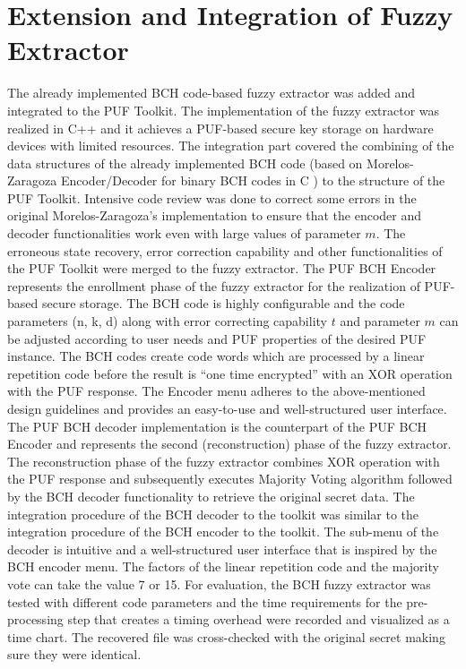 \section{Extension and Integration of Fuzzy Extractor}
The already implemented BCH code-based fuzzy extractor was added and integrated to the PUF Toolkit. The implementation of the fuzzy extractor was realized in C++ and it achieves a PUF-based secure key storage on hardware devices with limited resources. The integration part covered the combining of the data structures of the already implemented BCH code (based on Morelos-Zaragoza Encoder/Decoder for binary BCH codes in C \cite{69}) to the structure of the PUF Toolkit. Intensive code review was
done to correct some errors in the original Morelos-Zaragoza's implementation to ensure that the encoder and decoder functionalities work even with large values of parameter $m$. The erroneous state recovery, error correction capability and other functionalities of the PUF Toolkit were merged to the fuzzy extractor. The PUF BCH Encoder represents the enrollment phase of the fuzzy extractor for the realization of PUF-based secure storage. The BCH code is highly configurable and the code
parameters (n, k, d) along with error correcting capability $t$ and parameter $m$ can be adjusted according to user needs and PUF properties of the desired PUF instance. The BCH codes create code words which are processed by a linear repetition code before the result is ``one time encrypted'' with an XOR operation with the PUF response. The Encoder menu adheres to the above-mentioned design guidelines and provides an easy-to-use and well-structured user interface. The PUF BCH decoder
implementation is the counterpart of the PUF BCH Encoder and represents the second (reconstruction) phase of the fuzzy extractor. The reconstruction phase of the fuzzy extractor combines XOR operation with the PUF response and subsequently executes Majority Voting algorithm followed by the BCH decoder functionality to retrieve the original secret data. The integration procedure of the BCH decoder to the toolkit was similar to the integration procedure of the BCH encoder to the toolkit. The sub-menu of the
decoder is intuitive and a well-structured user interface that is inspired by the BCH encoder menu. The factors of the linear repetition code and the majority vote can take the value 7 or 15. For evaluation, the BCH fuzzy extractor was tested with different code parameters and the time requirements for the pre-processing step that creates a timing overhead were recorded and visualized as a time chart. The recovered file was cross-checked with the original secret making sure they were
identical.\\

